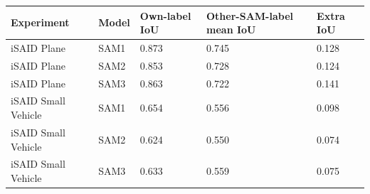 \begin{tabular}{lllll}
\toprule
Experiment & Model & Own-label IoU & Other-SAM-label mean IoU & Extra IoU \\
\midrule
iSAID Plane & SAM1 & 0.873 & 0.745 & 0.128 \\
iSAID Plane & SAM2 & 0.853 & 0.728 & 0.124 \\
iSAID Plane & SAM3 & 0.863 & 0.722 & 0.141 \\
iSAID Small Vehicle & SAM1 & 0.654 & 0.556 & 0.098 \\
iSAID Small Vehicle & SAM2 & 0.624 & 0.550 & 0.074 \\
iSAID Small Vehicle & SAM3 & 0.633 & 0.559 & 0.075 \\
\bottomrule
\end{tabular}
